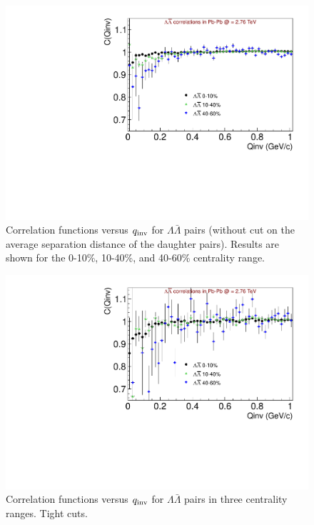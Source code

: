 \begin{figure}[hbtp]
\includegraphics[scale=0.7]{MixCFs_No_MergeCut.pdf}
\caption[Correlation functions versus $q_{\rm inv}$ for $\Lambda\bar{\Lambda}$ pairs in three centrality ranges. No merging cuts]{Correlation functions versus $q_{\rm inv}$ for $\Lambda\bar{\Lambda}$ pairs (without cut on the average separation distance of the daughter pairs).  Results are shown for the 0-10\%, 10-40\%, and 40-60\% centrality range.}
\label{fig:CFNoMergeMix}
\end{figure}

\begin{figure}[hbtp]
\includegraphics[scale=0.7]{Mix_Tight_cuts_ANote.pdf}
\caption{Correlation functions versus $q_{\rm inv}$ for $\Lambda\bar{\Lambda}$ pairs in three centrality ranges. Tight cuts.}
\label{fig:CFTightCutsMix}
\end{figure}

